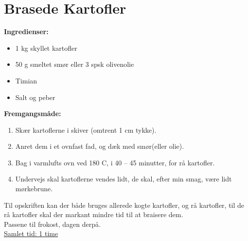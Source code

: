 \documentclass{book}
\begin{document}
\newpage \section{Brasede Kartofler}
\begin{minipage}[t]{0.5\textwidth}
\textbf{Ingredienser:}
\begin{itemize}
    \item 1 kg skyllet kartofler
\item 50 g smeltet smør eller 3 spsk olivenolie
\item Timian
\item Salt og peber
\end{itemize}
\end{minipage}
\begin{minipage}[t]{0.5\textwidth}
\textbf{Fremgangsmåde:}
\begin{enumerate}
    \item Skær kartoflerne i skiver (omtrent 1 cm tykke).
\item Anret dem i et ovnfast fad, og dæk med smør(eller olie).
\item Bag i varmlufts ovn ved 180 \degree C, i 40 – 45 minutter, for rå kartofler.
\item Undervejs skal kartoflerne vendes lidt, de skal, efter min smag, være lidt mørkebrune.
\end{enumerate}
\end{minipage}
Til opskriften kan der både bruges allerede kogte kartofler, og rå kartofler, til de rå kartofler skal der markant mindre tid til at braisere dem. 
\\ Passene til frokost, dagen derpå.
\\ \underline{Samlet tid: 1 time}
\end{document}
